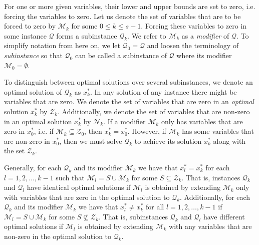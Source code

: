 For one or more given variables, their lower and upper bounds are set to zero,
i.e. forcing the variables to zero.
Let us denote the set of variables that are to be forced to zero by
$\mathcal{M}_k$ for some $0 \leq k \leq s - 1$.
Forcing these variables to zero in some instance $\mathcal{Q}$ forms
a subinstance $\mathcal{Q}_k$. We refer to $\mathcal{M}_k$ as a
\emph{modifier} of $\mathcal{Q}$.
To simplify notation from here on, we let
$\mathcal{Q}_0 = \mathcal{Q}$ and loosen the terminology of
\emph{subinstance} so that $\mathcal{Q}_0$ can be called a subinstance of
$\mathcal{Q}$ where its modifier $\mathcal{M}_0 = \emptyset$.

To distinguish between optimal solutions over several subinstances, we denote
an optimal solution of $\mathcal{Q}_k$ as $x_k^*$.
In any solution of any instance there might be variables that are zero.
We denote the set of variables that are zero in an \emph{optimal} solution
$x_k^*$ by $\mathcal{Z}_k$.
Additionally, we denote the set of variables that are non-zero in an 
optimal solution $x_k^*$ by $\mathcal{N}_k$.
If a modifier $\mathcal{M}_k$ only has variables that are zero in $x_0^*$,
i.e. if $\mathcal{M}_k \subseteq \mathcal{Z}_0$, then $x_k^* = x_0^*$. However,
if $\mathcal{M}_k$ has some variables that are non-zero in $x_0^*$, then
we must solve $\mathcal{Q}_k$ to achieve its solution $x_k^*$ along with the
set $\mathcal{Z}_k$.

Generally, for each $\mathcal{Q}_k$ and its modifier $\mathcal{M}_k$ we
have that $x_l^* = x_k^*$ for each $l=1,2,\ldots,k-1$ such that
$\mathcal{M}_l = S \cup \mathcal{M}_k$ for some $S \subseteq \mathcal{Z}_k$.
That is, instances $\mathcal{Q}_k$ and $\mathcal{Q}_l$ have identical optimal
solutions if $\mathcal{M}_l$ is obtained by extending $\mathcal{M}_k$ only with
variables that are zero in the optimal solution to $\mathcal{Q}_k$.
Additionally, for each $\mathcal{Q}_k$ and its modifier $\mathcal{M}_k$ we
have that $x_l^* \neq x_k^*$ for all $l=1,2,\ldots,k-1$ if
$\mathcal{M}_l = S \cup \mathcal{M}_k$ for some $S\not\subseteq \mathcal{Z}_k$.
That is, subinstances $\mathcal{Q}_k$ and $\mathcal{Q}_l$ have different
optimal solutions if $\mathcal{M}_l$ is obtained by extending $\mathcal{M}_k$
with any variables that are non-zero in the optimal solution to
$\mathcal{Q}_k$.
